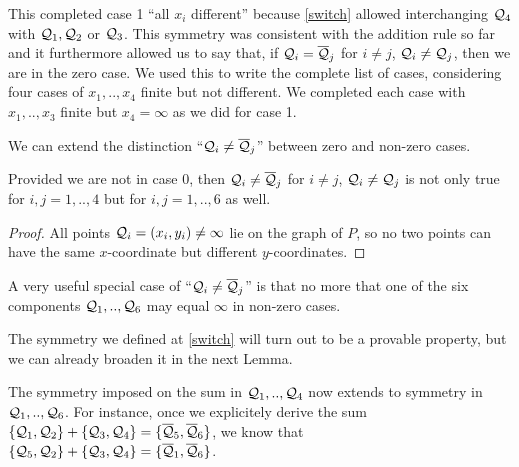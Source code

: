 \documentclass[english,11pt,a4paper]{article}
\begin{document}
This completed case 1 ``all $x_i$ different'' because \eqref{switch} allowed interchanging $\mathcal{Q}_4$ with $\mathcal{Q}_1, \mathcal{Q}_2$ or $\mathcal{Q}_3$. This symmetry was consistent with the addition rule so far and it furthermore allowed us to say that, if $\mathcal{Q}_i = \overline {\mathcal{Q}}_j$ for $i \neq j$, $\mathcal{Q}_i \neq \mathcal{Q}_j$, then we are in the zero case. We used this to write the complete list of cases, considering four cases of $x_1,..,x_4$ finite but not different. We completed each case with $x_1,..,x_3$ finite but $x_4 = \infty$ as we did for case 1.

We can extend the distinction ``$\mathcal{Q}_i \neq \overline {\mathcal{Q}}_j$'' between zero and non-zero cases.

\begin{lemma}\label{atmost1}
  Provided we are not in case 0, then $\mathcal{Q}_i \neq \overline {\mathcal{Q}}_j$ for $i \neq j$, $\mathcal{Q}_i \neq \mathcal{Q}_j$ is not only true for $i,j = 1,..,4$ but for $i,j = 1,..,6$ as well.

  \begin{proof}
    All points $\mathcal{Q}_i = (x_i,y_i) \neq \infty$ lie on the graph of $P$, so no two points can have the same $x$-coordinate but different $y$-coordinates.
  \end{proof}


  A very useful special case of ``$\mathcal{Q}_i \neq \overline {\mathcal{Q}}_j$'' is that no more that one of the six components $\mathcal{Q}_1,.., \mathcal{Q}_6$ may equal $\infty$ in non-zero cases.
\end{lemma}


The symmetry we defined at \eqref{switch} will turn out to be a provable property, but we can already broaden it in the next Lemma.

\begin{lemma}\label{symall}
  The symmetry imposed on the sum in $\mathcal{Q}_1, .., \mathcal{Q}_4$ now extends to symmetry in $\mathcal{Q}_1, .., \mathcal{Q}_6$. For instance, once we explicitely derive the sum $\{\mathcal{Q}_1, \mathcal{Q}_2 \} +\{ \mathcal{Q}_3 , \mathcal{Q}_4 \} = \{\overline {\mathcal{Q}}_5 , \overline {\mathcal{Q}}_6\}$, we know that $\{\mathcal{Q}_5, \mathcal{Q}_2 \} +\{ \mathcal{Q}_3 , \mathcal{Q}_4 \} = \{\overline {\mathcal{Q}}_1 , \overline {\mathcal{Q}}_6\}$.
\end{lemma}
\end{document}
